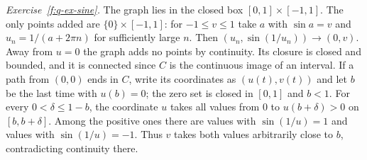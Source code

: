 \smallskip\noindent\emph{Exercise~\ref{f:q-ex-sine}.}
The graph lies in the closed box $[0,1]\times[-1,1]$. The only points added are $\{0\}\times[-1,1]$: for $-1\leq v\leq1$ take $a$ with $\sin a=v$ and $u_n=1/(a+2\pi n)$ for sufficiently large $n$. Then $(u_n,\sin(1/u_n))\to(0,v)$. Away from $u=0$ the graph adds no points by continuity. Its closure is closed and bounded, and it is connected since $C$ is the continuous image of an interval. If a path from $(0,0)$ ends in $C$, write its coordinates as $(u(t),v(t))$ and let $b$ be the last time with $u(b)=0$; the zero set is closed in $[0,1]$ and $b<1$. For every $0<\delta\leq1-b$, the coordinate $u$ takes all values from $0$ to $u(b+\delta)>0$ on $[b,b+\delta]$. Among the positive ones there are values with $\sin(1/u)=1$ and values with $\sin(1/u)=-1$. Thus $v$ takes both values arbitrarily close to $b$, contradicting continuity there.
